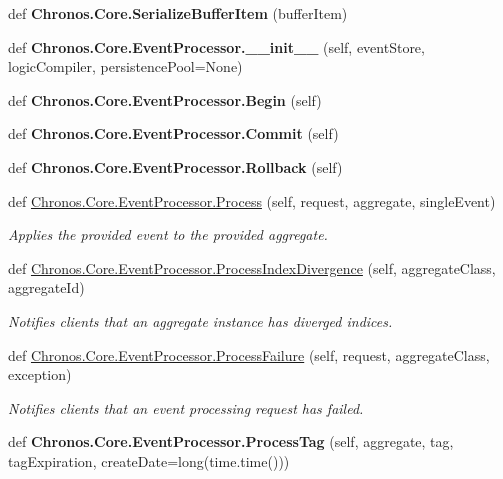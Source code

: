\begin{DoxyCompactItemize}
\item 
def {\bfseries Chronos.\+Core.\+Serialize\+Buffer\+Item} (buffer\+Item)\hypertarget{group__Chronos_ga8cc5283b2332d8772204c1873394ab76}{}\label{group__Chronos_ga8cc5283b2332d8772204c1873394ab76}

\item 
def {\bfseries Chronos.\+Core.\+Event\+Processor.\+\_\+\+\_\+init\+\_\+\+\_\+} (self, event\+Store, logic\+Compiler, persistence\+Pool=None)\hypertarget{group__Chronos_ga76be9cba68e8b9262dd37f8a5ca40a6a}{}\label{group__Chronos_ga76be9cba68e8b9262dd37f8a5ca40a6a}

\item 
def {\bfseries Chronos.\+Core.\+Event\+Processor.\+Begin} (self)\hypertarget{group__Chronos_gac6d470b10e12a6912f28dc6577976ed1}{}\label{group__Chronos_gac6d470b10e12a6912f28dc6577976ed1}

\item 
def {\bfseries Chronos.\+Core.\+Event\+Processor.\+Commit} (self)\hypertarget{group__Chronos_ga6ea36ecf2b6dec6fa00cbdc705a56484}{}\label{group__Chronos_ga6ea36ecf2b6dec6fa00cbdc705a56484}

\item 
def {\bfseries Chronos.\+Core.\+Event\+Processor.\+Rollback} (self)\hypertarget{group__Chronos_ga00d892caf19b0c34212a8ab720f48dfb}{}\label{group__Chronos_ga00d892caf19b0c34212a8ab720f48dfb}

\item 
def \hyperlink{group__Chronos_gaa715d77da2ab4a07c97ddc27b6691b69}{Chronos.\+Core.\+Event\+Processor.\+Process} (self, request, aggregate, single\+Event)
\begin{DoxyCompactList}\small\item\em Applies the provided event to the provided aggregate. \end{DoxyCompactList}\item 
def \hyperlink{group__Chronos_gaef2d2639259438495b17f1ab5903bbb7}{Chronos.\+Core.\+Event\+Processor.\+Process\+Index\+Divergence} (self, aggregate\+Class, aggregate\+Id)
\begin{DoxyCompactList}\small\item\em Notifies clients that an aggregate instance has diverged indices. \end{DoxyCompactList}\item 
def \hyperlink{group__Chronos_ga9ec5fe085282e9ee1909ee9b5752e44b}{Chronos.\+Core.\+Event\+Processor.\+Process\+Failure} (self, request, aggregate\+Class, exception)
\begin{DoxyCompactList}\small\item\em Notifies clients that an event processing request has failed. \end{DoxyCompactList}\item 
def {\bfseries Chronos.\+Core.\+Event\+Processor.\+Process\+Tag} (self, aggregate, tag, tag\+Expiration, create\+Date=long(time.\+time()))\hypertarget{group__Chronos_ga2eccfa718a93e5ab0be83dd91c1f8b61}{}\label{group__Chronos_ga2eccfa718a93e5ab0be83dd91c1f8b61}


\end{DoxyCompactItemize}

